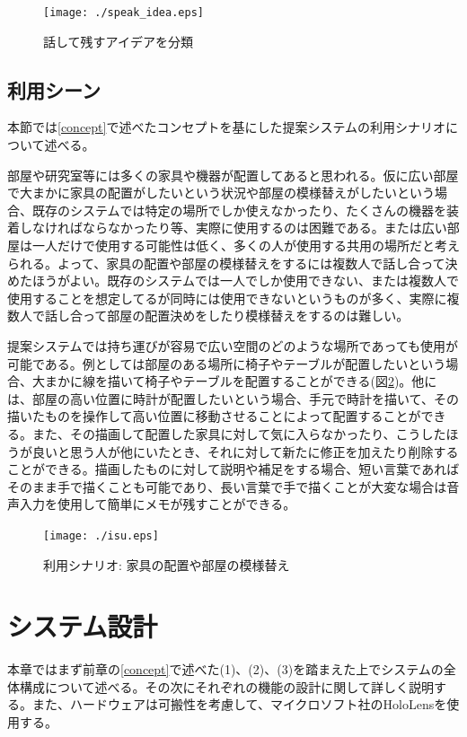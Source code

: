 \documentclass[11pt,a4j, titlepage]{jarticle} %
\begin{document}
\begin{figure}[H]
  \begin{center}
    \texttt{[image: ./speak\_idea.eps]}
    \caption{話して残すアイデアを分類}
    \label{fig:speak_idea}
  \end{center}
\end{figure}

\subsection{利用シーン}
本節では\ref{concept}で述べたコンセプトを基にした提案システムの利用シナリオについて述べる。

部屋や研究室等には多くの家具や機器が配置してあると思われる。仮に広い部屋で大まかに家具の配置がしたいという状況や部屋の模様替えがしたいという場合、既存のシステムでは特定の場所でしか使えなかったり、たくさんの機器を装着しなければならなかったり等、実際に使用するのは困難である。または広い部屋は一人だけで使用する可能性は低く、多くの人が使用する共用の場所だと考えられる。よって、家具の配置や部屋の模様替えをするには複数人で話し合って決めたほうがよい。既存のシステムでは一人でしか使用できない、または複数人で使用することを想定してるが同時には使用できないというものが多く、実際に複数人で話し合って部屋の配置決めをしたり模様替えをするのは難しい。

提案システムでは持ち運びが容易で広い空間のどのような場所であっても使用が可能である。例としては部屋のある場所に椅子やテーブルが配置したいという場合、大まかに線を描いて椅子やテーブルを配置することができる(図\ref{fig:isu})。他には、部屋の高い位置に時計が配置したいという場合、手元で時計を描いて、その描いたものを操作して高い位置に移動させることによって配置することができる。また、その描画して配置した家具に対して気に入らなかったり、こうしたほうが良いと思う人が他にいたとき、それに対して新たに修正を加えたり削除することができる。描画したものに対して説明や補足をする場合、短い言葉であればそのまま手で描くことも可能であり、長い言葉で手で描くことが大変な場合は音声入力を使用して簡単にメモが残すことができる。

\begin{figure}[H]
  \begin{center}
    \texttt{[image: ./isu.eps]}
    \caption{利用シナリオ: 家具の配置や部屋の模様替え}
    \label{fig:isu}
  \end{center}
\end{figure}

\newpage
\section{システム設計}
本章ではまず前章の\ref{concept}で述べた(1)、(2)、(3)を踏まえた上でシステムの全体構成について述べる。その次にそれぞれの機能の設計に関して詳しく説明する。また、ハードウェアは可搬性を考慮して、マイクロソフト社のHoloLens\cite{hololens}を使用する。
\end{document}
